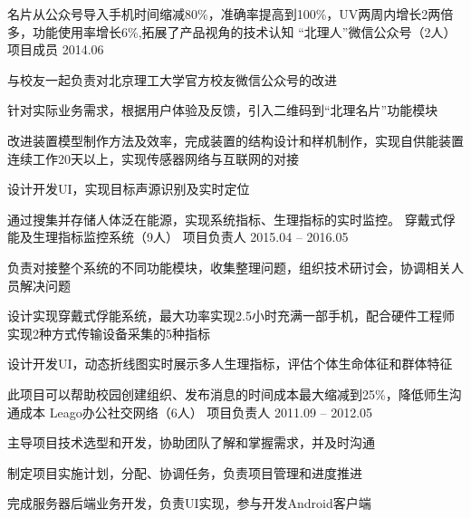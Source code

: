\begin{cventries}
\cventry
{名片从公众号导入手机时间缩减80\%，准确率提高到100\%，UV两周内增长2两倍多，功能使用率增长6\%,拓展了产品视角的技术认知} %
{“北理人”微信公众号（2人）} %
{项目成员} %
{2014.06} %
{ %
\begin{cvitems}
\item {与校友一起负责对北京理工大学官方校友微信公众号的改进}
\item {针对实际业务需求，根据用户体验及反馈，引入二维码到“北理名片”功能模块}
\item{改进装置模型制作方法及效率，完成装置的结构设计和样机制作，实现自供能装置连续工作20天以上，实现传感器网络与互联网的对接}
\item{设计开发UI，实现目标声源识别及实时定位}
\end{cvitems} 
}

\cventry
{通过搜集并存储人体泛在能源，实现系统指标、生理指标的实时监控。} %
{穿戴式俘能及生理指标监控系统（9人）} %
{项目负责人} %
{2015.04 -- 2016.05} %
{ %
\begin{cvitems}
\item {负责对接整个系统的不同功能模块，收集整理问题，组织技术研讨会，协调相关人员解决问题}
\item {设计实现穿戴式俘能系统，最大功率实现2.5小时充满一部手机，配合硬件工程师实现2种方式传输设备采集的5种指标}
\item{设计开发UI，动态折线图实时展示多人生理指标，评估个体生命体征和群体特征}
\end{cvitems} 
}


\cventry
{此项目可以帮助校园创建组织、发布消息的时间成本最大缩减到25\%，降低师生沟通成本} %
{Leago办公社交网络（6人）} %
{项目负责人} %
{2011.09 -- 2012.05} %
{ %
\begin{cvitems}
\item {主导项目技术选型和开发，协助团队了解和掌握需求，并及时沟通}
\item {制定项目实施计划，分配、协调任务，负责项目管理和进度推进}
\item{完成服务器后端业务开发，负责UI实现，参与开发Android客户端}
\end{cvitems}
}

\end{cventries}


